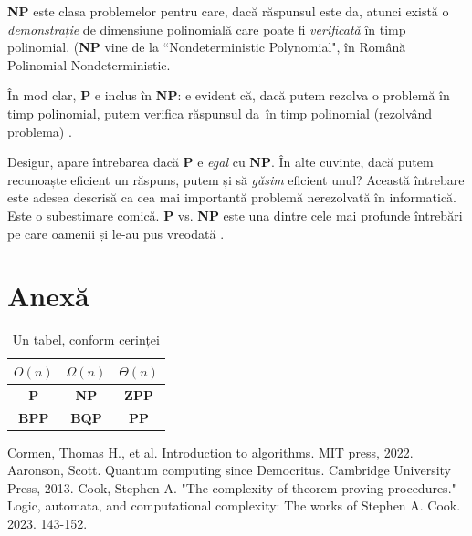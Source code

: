 \documentclass{article}
\begin{document}
\textbf{NP} este clasa problemelor pentru care, dacă răspunsul este \glqq
da\grqq, atunci există o \emph{demonstrație} de dimensiune polinomială care
poate fi \emph{verificată} în timp polinomial. (\textbf{NP} vine de la
``Nondeterministic Polynomial", în Română \glqq Polinomial Nondeterministic\grqq \cite{qcsd}.

În mod clar, \textbf{P} e inclus în \textbf{NP}: e evident că, dacă putem
rezolva o problemă în timp polinomial, putem verifica răspunsul \glqq da\grqq \
în timp polinomial (rezolvând problema) \cite{cook_pvsnp}.

Desigur, apare întrebarea dacă \textbf{P} e \emph{egal} cu \textbf{NP}. În alte
cuvinte, dacă putem recunoaște eficient un răspuns, putem și să \emph{găsim}
eficient unul? Această întrebare este adesea descrisă ca \glqq cea mai importantă
problemă nerezolvată în informatică\grqq. Este o subestimare comică. \textbf{P}
vs. \textbf{NP} este una dintre cele mai profunde întrebări pe care oamenii și
le-au pus vreodată \cite{qcsd}.

\section{Anexă}
\begin{table}[hbtp]
	\begin{center}
		\begin{tabular}{| c | c | c |}
			\hline
			$O(n)$       & $\Omega(n)$  & $\Theta(n)$  \\
			\hline
			\textbf{P}   & \textbf{NP}  & \textbf{ZPP} \\
			\hline
			\textbf{BPP} & \textbf{BQP} & \textbf{PP}  \\
			\hline
		\end{tabular}
	\end{center}
	\caption{Un tabel, conform cerinței}
\end{table}

\begin{thebibliography}{ }
	Cormen, Thomas H., et al. Introduction to algorithms. MIT press, 2022.
	\bibitem{qcsd}
	Aaronson, Scott. Quantum computing since Democritus. Cambridge University Press, 2013.
	\bibitem{cook_pvsnp}
	Cook, Stephen A. "The complexity of theorem-proving procedures." Logic,
	automata, and computational complexity: The works of Stephen A. Cook. 2023.
	143-152.
\end{thebibliography}
\end{document}
